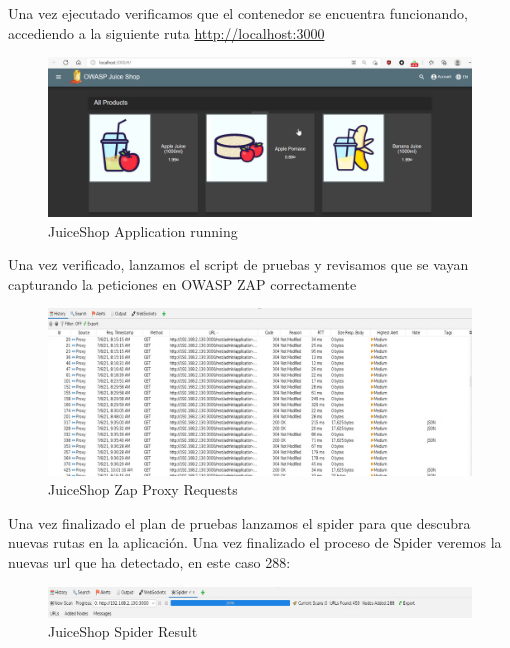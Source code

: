 Una vez ejecutado verificamos que el contenedor se encuentra funcionando, accediendo a la siguiente 
ruta \url{http://localhost:3000}

\begin{figure}[!htb]
    \captionsetup{width=1\linewidth}  
    \includegraphics[width=\linewidth]{./imagenes/04_1_3_01_JuiceShop_ContainerUP.png}
    \caption{JuiceShop Application running}  
    \label{fig:JuiceShop Application running}
\end{figure}

Una vez verificado, lanzamos el script de pruebas y revisamos que se vayan capturando la peticiones en OWASP ZAP correctamente\\
\begin{figure}[!htb]
    \captionsetup{width=1\linewidth}  
    \includegraphics[width=\linewidth]{./imagenes/04_1_3_02_JuiceShop_ZapProxyRQST.png}
    \caption{JuiceShop Zap Proxy Requests}  
    \label{fig:JuiceShop Zap Proxy Requests}
\end{figure}

Una vez finalizado el plan de pruebas lanzamos el spider para que descubra nuevas rutas en la aplicación. Una vez finalizado 
el proceso de Spider veremos la nuevas url que ha detectado, en este caso 288:\\

\begin{figure}[!htb]
    \captionsetup{width=1\linewidth}  
    \includegraphics[width=\linewidth]{./imagenes/04_1_3_03_JuiceShop_ZapProxySpiderResult.png}
    \caption{JuiceShop Spider Result}  
    \label{fig:JuiceShop Spider Result}
\end{figure}

